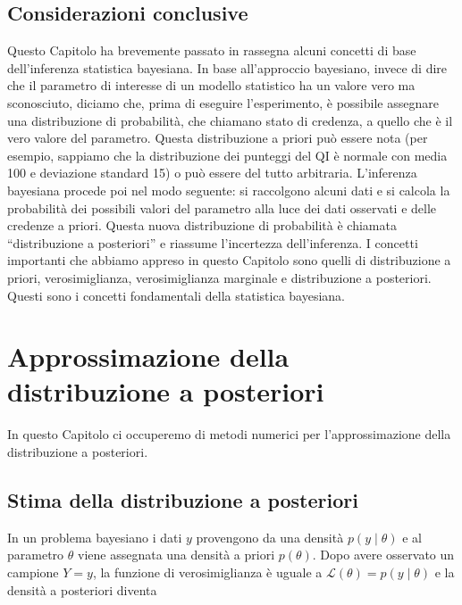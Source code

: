 \documentclass[
  11pt,
]{krantz}
\theoremstyle{definition}
\theoremstyle{definition}
\theoremstyle{definition}
\theoremstyle{definition}
\theoremstyle{remark}
\begin{document}
\hypertarget{considerazioni-conclusive}{%
\section*{Considerazioni conclusive}\label{considerazioni-conclusive}}


Questo Capitolo ha brevemente passato in rassegna alcuni concetti di base dell'inferenza statistica bayesiana. In base all'approccio bayesiano, invece di dire che il parametro di interesse di un modello statistico ha un valore vero ma sconosciuto, diciamo che, prima di eseguire l'esperimento, è possibile assegnare una distribuzione di probabilità, che chiamano stato di credenza, a quello che è il vero valore del parametro. Questa distribuzione a priori può essere nota (per esempio, sappiamo che la distribuzione dei punteggi del QI è normale con media 100 e deviazione standard 15) o può essere del tutto arbitraria. L'inferenza bayesiana procede poi nel modo seguente: si raccolgono alcuni dati e si calcola la probabilità dei possibili valori del parametro alla luce dei dati osservati e delle credenze a priori. Questa nuova distribuzione di probabilità è chiamata ``distribuzione a posteriori'' e riassume l'incertezza dell'inferenza. I concetti importanti che abbiamo appreso in questo Capitolo sono quelli di distribuzione a priori, verosimiglianza, verosimiglianza marginale e distribuzione a posteriori. Questi sono i concetti fondamentali della statistica bayesiana.

\hypertarget{metropolis}{%
\chapter{Approssimazione della distribuzione a posteriori}\label{metropolis}}

In questo Capitolo ci occuperemo di metodi numerici per l'approssimazione della distribuzione a posteriori.

\hypertarget{stima-della-distribuzione-a-posteriori}{%
\section{Stima della distribuzione a posteriori}\label{stima-della-distribuzione-a-posteriori}}

In un problema bayesiano i dati \(y\) provengono da una densità \(p(y \mid \theta)\) e al parametro \(\theta\) viene assegnata una densità a priori \(p(\theta)\). Dopo avere osservato un campione \(Y = y\), la funzione di verosimiglianza è uguale a \(\mathcal{L}(\theta) = p(y \mid \theta)\) e la densità a posteriori diventa
\end{document}
